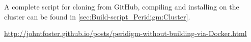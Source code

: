 A complete script for cloning \toolname{} from GitHub, compiling and installing on the cluster can be found in \autoref{sec:Build-script_Peridigm:Cluster}.


\href{http://johntfoster.github.io/posts/peridigm-without-building-via-Docker.html}{http://johntfoster.github.io/posts/peridigm-without-building-via-Docker.html} 